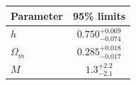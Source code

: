 \begin{tabular} { l  c}

 Parameter &  95\% limits\\
\hline
{\boldmath$h              $} & $0.750^{+0.069}_{-0.074}   $\\

{\boldmath$Ω_m            $} & $0.285^{+0.018}_{-0.017}   $\\

{\boldmath$M              $} & $1.3^{+2.2}_{-2.1}         $\\
\hline
\end{tabular}